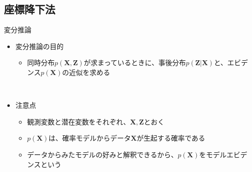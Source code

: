\documentclass[dvipdfmx,notheorems,t]{beamer}
\begin{document}
\subsection{座標降下法}

\begin{frame}{変分推論}

\begin{itemize}
	\item 変分推論の目的
	\begin{itemize}
		\item 同時分布$p(\bm{X}, \bm{Z})$が求まっているときに、\alert{事後分布}$p(\bm{Z} | \bm{X})$と、\alert{エビデンス}$p(\bm{X})$の近似を求める
	\end{itemize} \
	
	\item 注意点
	\begin{itemize}
		\item 観測変数と潜在変数をそれぞれ、$\bm{X}, \bm{Z}$とおく
		\item $p(\bm{X})$は、確率モデルからデータ$\bm{X}$が生起する確率である
		\item \alert{データからみたモデルの好み}と解釈できるから、$p(\bm{X})$を\alert{モデルエビデンス}という
	\end{itemize}
\end{itemize}

\end{frame}
\end{document}
